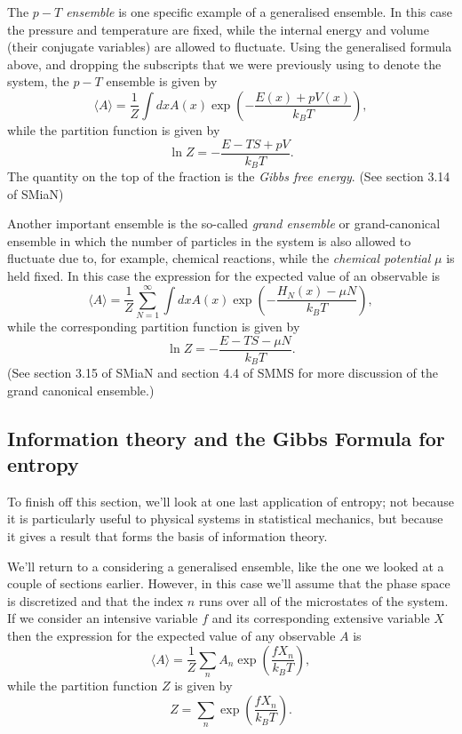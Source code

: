 The \emph{$p-T$ ensemble} is one specific example of a generalised ensemble. In this case the pressure and temperature are fixed, while the internal energy and volume (their conjugate variables) are allowed to fluctuate.
Using the generalised formula above, and dropping the subscripts that we were previously using to denote the system, the $p-T$ ensemble is given by
 \begin{equation*}
	\langle A\rangle = \frac{1}{Z}\int dxA(x)\exp\left(-\frac{E(x)+pV(x)}{k_BT}\right),
\end{equation*}
while the partition function is given by
$$
	\ln Z = -\frac{E-TS+pV}{k_BT}.
$$
The quantity on the top of the fraction is the \emph{Gibbs free energy}. (See section 3.14 of SMiaN)

Another important ensemble is the so-called \emph{grand ensemble} or grand-canonical ensemble in which the number of particles in the system is also allowed to fluctuate due to, for example, chemical reactions, while the \emph{chemical potential} $\mu$ is held fixed. In this case the expression for the expected value of an observable is
$$
	\langle A \rangle = \frac{1}{Z} \sum_{N=1}^\infty \int dxA(x)\exp\left(-\frac{H_N(x)-\mu N}{k_BT}\right),
$$
while the corresponding partition function is given by
$$
	\ln Z = -\frac{E-TS-\mu N}{k_BT}.
$$
(See section 3.15 of SMiaN and section 4.4 of SMMS for more discussion of the grand canonical ensemble.)

\subsection*{Information theory and the Gibbs Formula for entropy}
To finish off this section, we'll look at one last application of entropy; not because it is particularly useful to physical systems in statistical mechanics, but because it gives a result that forms the basis of information theory.

We'll return to a considering a generalised ensemble, like the one we looked at a couple of sections earlier. However, in this case we'll assume that the phase space is discretized and that the index $n$ runs over all of the microstates of the system. If we consider an intensive variable $f$ and its corresponding extensive variable $X$ then the expression for the expected value of any observable $A$ is
$$
	\langle A \rangle = \frac{1}{Z}\sum_n A_n\exp\left(\frac{fX_n}{k_BT}\right),
$$
while the partition function $Z$ is given by
$$
	Z =\sum_n\exp\left(\frac{fX_n}{k_BT}\right).
$$

